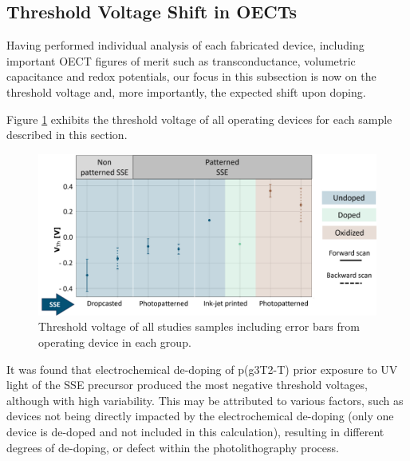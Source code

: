 \subsection{Threshold Voltage Shift in OECTs} \label{subsec:vth_shift}

Having performed individual analysis of each fabricated device, including important OECT figures of merit such as transconductance, volumetric capacitance and redox potentials, %
our focus in this subsection is now on the threshold voltage and, more importantly, the expected shift upon doping.

Figure \ref{fig:vth_shift_final} exhibits the threshold voltage of all operating devices for each sample described in this section.

\begin{figure}[ht]
    \centering
    \includegraphics[width=\textwidth]{Images/pdf/Vth_shift_plot.pdf} 
    \caption[Threshold voltage shift of all studied devices]{Threshold voltage of all studies samples including error bars from operating device in each group.}
    \label{fig:vth_shift_final}
\end{figure}

It was found that electrochemical de-doping of p(g3T2-T) prior exposure to UV light of the SSE precursor produced the most negative threshold voltages, although with high variability. This may be attributed to various factors, such as devices not being directly impacted by the electrochemical de-doping (only one device is de-doped and not included in this calculation), resulting in different degrees of de-doping, or defect within the photolithography process. 

